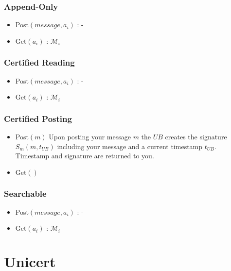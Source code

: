 \documentclass[bibtotoc,halfparskip,oneside]{scrreprt}
\newcommand{\UB}{\ensuremath{\mathit{UB}}\xspace}
\begin{document}
\subsection{Append-Only}

\begin{itemize}
	\item Post$(message,a_i)$ : -
	\item Get$(a_i)$ : $\mathcal{M}_i$
\end{itemize}

\subsection{Certified Reading}

\begin{itemize}
	\item Post$(message,a_i)$ : -
	\item Get$(a_i)$ : $\mathcal{M}_i$
\end{itemize}

\subsection{Certified Posting}

\begin{itemize}
	\item Post$(m)$ Upon posting your message $m$ the \UB creates the signature $S_m(m,t_\UB)$ including your message
	and a current timestamp $t_\UB$. Timestamp and signature are returned to you.
	\item Get$()$ 
\end{itemize}

\subsection{Searchable}

\begin{itemize}
	\item Post$(message,a_i)$ : -
	\item Get$(a_i)$ : $\mathcal{M}_i$
\end{itemize}

\chapter{Unicert}
\end{document}
